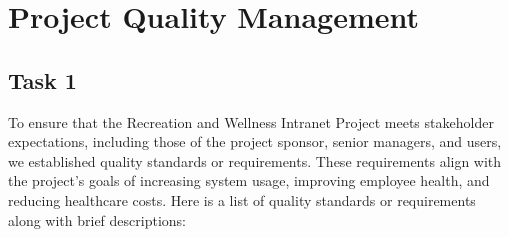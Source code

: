\chapter{Project Quality Management}

\section{Task 1}

To ensure that the Recreation and Wellness Intranet Project meets stakeholder expectations, including those of the project sponsor, senior managers, and users, we established quality standards or requirements. These requirements align with the project's goals of increasing system usage, improving employee health, and reducing healthcare costs. Here is a list of quality standards or requirements along with brief descriptions:

